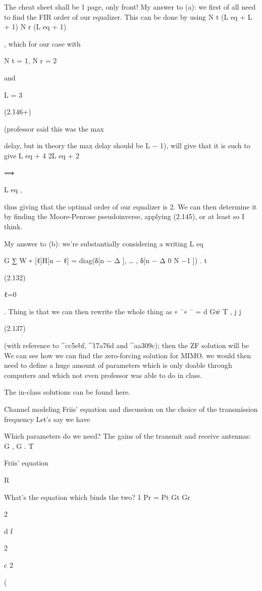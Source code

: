 {{{The cheat sheet shall be 1 page, only front!
My answer to (a): we first of all need to find the FIR order of our equalizer. This can be done by using N t (L eq + L + 1) \leq N r (L eq + 1)

, which for our case with

N t = 1, N r = 2

and

L = 3

(2.146+)

(professor said this was the max

delay, but in theory the max delay should be L − 1), will give that it is such to give L eq + 4 \leq 2L eq + 2

⟹

L eq  ,

thus giving that the optimal order of our equalizer is 2. We can then determine it by finding the Moore-Penrose pseudoinverse, applying (2.145), or at least so I think.

My answer to (b): we're substantially considering a writing L eq

\sqrt G ∑ W ∗ [ℓ]H[n − ℓ] = diag(δ[n − Δ ], … , δ[n − Δ 0 N −1 ]) .
t

(2.132)

ℓ=0

.
Thing is that we can then rewrite the whole thing as
∗
¯∗
¯ = d
\sqrt Gw̄ T
,
j j

(2.137)

(with reference to ^cc5ebf, ^17a76d and ^aa309c); then the ZF solution will be We can see how we can find the zero-forcing solution for MIMO.
we would then need to define a huge amount of parameters which is only doable through computers and which not even professor was able to do in class.

The in-class solutions can be found here.

Channel modeling Friis' equation and discussion on the choice of the transmission frequency Let's say we have

Which parameters do we need?
The gains of the transmit and receive antennas: G , G .
T

Friis' equation

R

What's the equation which binds the two?
1 Pr = Pt Gt Gr

2

d f

2

c 2

(

}}}
